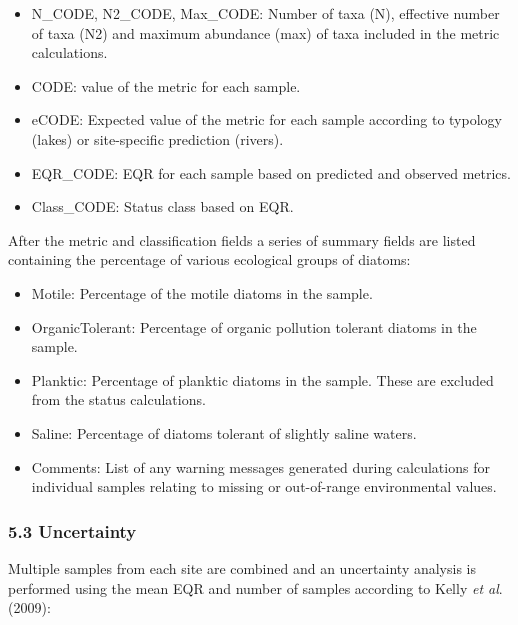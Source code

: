 \documentclass[
]{article}
\begin{document}
\begin{itemize}
\item
  N\_CODE, N2\_CODE, Max\_CODE: Number of taxa (N), effective number of
  taxa (N2) and maximum abundance (max) of taxa included in the metric
  calculations.
\item
  CODE: value of the metric for each sample.
\item
  eCODE: Expected value of the metric for each sample according to
  typology (lakes) or site-specific prediction (rivers).
\item
  EQR\_CODE: EQR for each sample based on predicted and observed
  metrics.
\item
  Class\_CODE: Status class based on EQR.
\end{itemize}

After the metric and classification fields a series of summary fields
are listed containing the percentage of various ecological groups of
diatoms:

\begin{itemize}
\item
  Motile: Percentage of the motile diatoms in the sample.
\item
  OrganicTolerant: Percentage of organic pollution tolerant diatoms in
  the sample.
\item
  Planktic: Percentage of planktic diatoms in the sample. These are
  excluded from the status calculations.
\item
  Saline: Percentage of diatoms tolerant of slightly saline waters.
\item
  Comments: List of any warning messages generated during calculations
  for individual samples relating to missing or out-of-range
  environmental values.
\end{itemize}

\hypertarget{uncertainty}{%
\subsubsection{5.3 Uncertainty}\label{uncertainty}}

Multiple samples from each site are combined and an uncertainty analysis
is performed using the mean EQR and number of samples according to Kelly
\emph{et al}. (2009):
\end{document}
